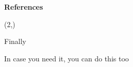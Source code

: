 \documentclass[final]{beamer}
\begin{document}
\begin{frame}[fragile]{}
\begin{textblock}{\rcolwidth}
\vspace{0.5cm}
\textbf{\normalsize References}

% 


\end{textblock}


\begin{textblock}{\fullwidth}(2,\bottomblockstart)
\begin{paddedBlock}[0.98\linewidth]{Finally}

In case you need it, you can do this too

\end{paddedBlock}
\end{textblock}

\end{frame}
\end{document}
